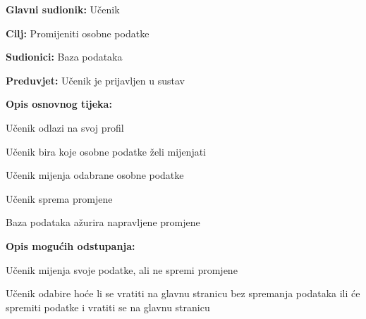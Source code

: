					\noindent {}
					\begin{packed_item}
	
						\item \textbf{Glavni sudionik: }Učenik
						\item  \textbf{Cilj:} Promijeniti osobne podatke
						\item  \textbf{Sudionici:} Baza podataka
						\item  \textbf{Preduvjet:} Učenik je prijavljen u sustav
						\item  \textbf{Opis osnovnog tijeka:}
						
						\item[] \begin{packed_enum}
	
							\item Učenik odlazi na svoj profil
							\item Učenik bira koje osobne podatke želi mijenjati
							\item Učenik mijenja odabrane osobne podatke
							\item Učenik sprema promjene
							\item Baza podataka ažurira napravljene promjene
						\end{packed_enum}
						
						\item  \textbf{Opis mogućih odstupanja:}
						
						\item[] \begin{packed_item}
	
							\item[4.a] Učenik mijenja svoje podatke, ali ne spremi promjene
							\item[] \begin{packed_enum}
								
								\item Učenik odabire hoće li se vratiti na glavnu stranicu bez spremanja podataka 
								ili će spremiti podatke i vratiti se na glavnu stranicu
								
							\end{packed_enum}
							
						\end{packed_item}
					\end{packed_item}

